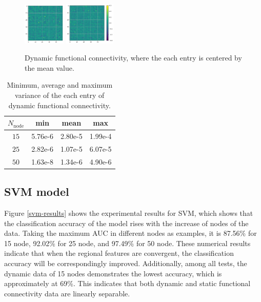 \documentclass[11pt]{article}
\begin{document}
\begin{figure}[H]
{        \includegraphics[width=0.18\textwidth]{../Analysis/DFC/size=480_step=180_rho=0.1/node=50_id=100206/n_c_18.jpg}
        \includegraphics[width=0.2175\textwidth]{../Analysis/DFC/size=480_step=180_rho=0.1/node=50_id=100206/c_24.jpg}}
    \caption{Dynamic functional connectivity, where the each entry is centered by the mean value.}
    \label{sample-dfc-c}
\end{figure}

\begin{table}[H]
    \centering
    \begin{tabular}{|c|c|c|c|}
        \hline
        $N_{\text{node}}$ & min     & mean    & max     \\
        \hline
        $15$              & 5.76e-6 & 2.80e-5 & 1.99e-4 \\
        \hline
        $25$              & 2.82e-6 & 1.07e-5 & 6.07e-5 \\
        \hline
        $50$              & 1.63e-8 & 1.34e-6 & 4.90e-6 \\
        \hline
    \end{tabular}
    \caption{Minimum, average and maximum variance of the each entry of dynamic functional connectivity.}
    \label{var-dfc}
\end{table}

\subsection{SVM model}

Figure \ref{svm-results} shows the experimental results for SVM, which shows that the classification accuracy of the model rises with the increase of nodes of the data. Taking the maximum AUC in different nodes as examples, it is 87.56\% for 15 node, 92.02\% for 25 node, and 97.49\% for 50 node. These numerical results indicate that when the regional features are convergent, the classification accuracy will be correspondingly improved. Additionally, among all tests, the dynamic data of 15 nodes demonstrates the lowest accuracy, which is approximately at 69\%. This indicates that both dynamic and static functional connectivity data are linearly separable.
\end{document}
